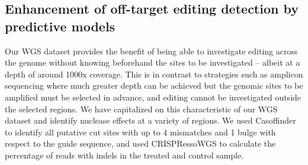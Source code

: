 \documentclass[a4paper, titlepage, openright]{book}
\begin{document}
\subsection{Enhancement of off-target editing detection by predictive models}
Our WGS dataset provides the benefit of being able to investigate editing across the genome without knowing beforehand the sites to be investigated – albeit at a depth of around 1000x coverage. This is in contrast to strategies such as amplicon sequencing where much greater depth can be achieved but the genomic sites to be amplified must be selected in advance, and editing cannot be investigated outside the selected regions. We have capitalized on this characteristic of our WGS dataset and identify nuclease effects at a variety of regions. We used Casoffinder to identify all putative cut sites with up to 4 mismatches and 1 bulge with respect to the guide sequence, and used CRISPRessoWGS \citep{clement2019crispresso2} to calculate the percentage of reads with indels in the treated and control sample.
\end{document}
